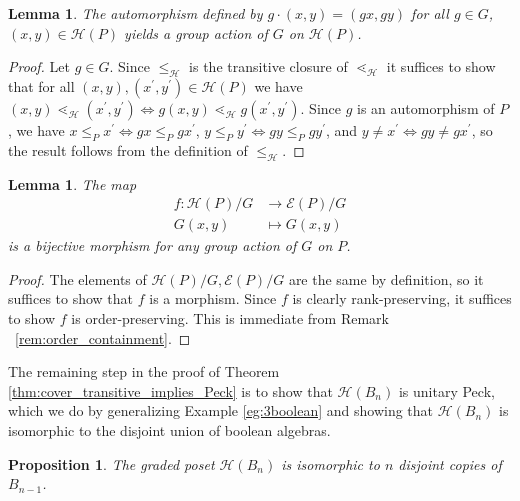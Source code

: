 \documentclass[smallextended, envcountsame, numbook]{svjour3}
\theoremstyle{plain}
\newtheorem{prop}[thm]{Proposition}
\newtheorem{lem}[thm]{Lemma}
\theoremstyle{definition}
\theoremstyle{remark}
\numberwithin{equation}{section}
\renewcommand{\iff}{\Leftrightarrow}
\begin{document}
\begin{lem}
\label{lem:G_action_on_HP}
The automorphism defined by $g\cdot (x, y)= (gx, gy)$ for all $g\in G$, $(x, y)\in \mathcal{H}(P)$ yields a group action of $G$ on $\mathcal{H}(P)$.
\end{lem}

\begin{proof}
Let $g\in G$.  Since $\le_{\mathcal{H}}$ is the transitive closure of $\lessdot_{\mathcal{H}}$ it suffices to show that for all $(x,y),(x^\prime,y^\prime)\in \mathcal{H}(P)$ we have $(x, y) \lessdot_{\mathcal H} (x^\prime,y^\prime) \iff g(x, y) \lessdot_{\mathcal H} g(x^\prime, y^\prime)$.  Since $g$ is an automorphism of $P$, we have $x\le_P x^\prime \iff gx\le_P gx^\prime$, $y\le_P y^\prime \iff gy\le_P gy^\prime$, and $y\neq x^\prime \iff gy\neq gx^\prime$, so the result follows from the definition of $\le_{\mathcal{H}}$.
\end{proof}

\begin{lem}
\label{lem:bijection_h_f}
The map 
\begin{align*}
	f\colon\mathcal H(P)/G &\rightarrow \mathcal E(P)/G \\
	G(x,y) &\mapsto G(x,y)
\end{align*}
 is a bijective morphism for any group action of $G$ on $P$.
\end{lem}

\begin{proof}
The elements of $\mathcal H(P)/G,\mathcal E(P)/G$ are the same by definition, so it suffices to show that $f$ is a morphism. Since $f$ is clearly rank-preserving, it suffices to show $f$ is order-preserving. This is immediate from Remark ~\ref{rem:order_containment}.
\end{proof}

The remaining step in the proof of Theorem \ref{thm:cover_transitive_implies_Peck} is to show that $\mathcal{H}(B_n)$ is unitary Peck, which we do by generalizing Example \ref{eg:3boolean} and showing that $\mathcal{H}(B_n)$ is isomorphic to the disjoint union of boolean algebras.

\begin{prop}\label{prop:computing_HBn}
The graded poset $\mathcal{H}(B_n)$ is isomorphic to $n$ disjoint copies of $B_{n-1}$.
\end{prop}
\end{document}
